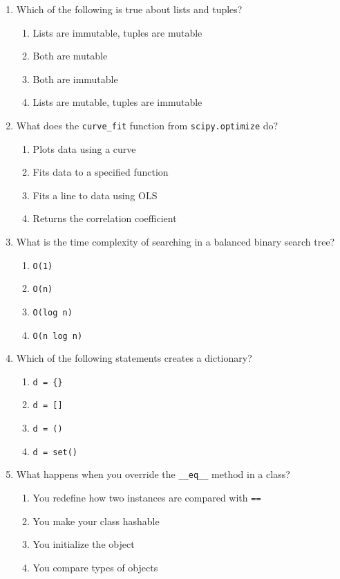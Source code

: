 \documentclass[12pt]{article}
\begin{document}
\begin{enumerate}[label=\arabic*.]
\item Which of the following is true about lists and tuples?  
\begin{enumerate}[label=\Alph*.]
\item Lists are immutable, tuples are mutable  
\item Both are mutable  
\item Both are immutable  
\item Lists are mutable, tuples are immutable
\end{enumerate}

\item What does the \texttt{curve\_fit} function from \texttt{scipy.optimize} do?  
\begin{enumerate}[label=\Alph*.]
\item Plots data using a curve  
\item Fits data to a specified function  
\item Fits a line to data using OLS  
\item Returns the correlation coefficient
\end{enumerate}

\item What is the time complexity of searching in a balanced binary search tree?  
\begin{enumerate}[label=\Alph*.]
\item \texttt{O(1)}  
\item \texttt{O(n)}  
\item \texttt{O(log n)}  
\item \texttt{O(n log n)}
\end{enumerate}

\item Which of the following statements creates a dictionary?  
\begin{enumerate}[label=\Alph*.]
\item \texttt{d = \{\}}  
\item \texttt{d = []}  
\item \texttt{d = ()}  
\item \texttt{d = set()}
\end{enumerate}

\item What happens when you override the \texttt{\_\_eq\_\_} method in a class?  
\begin{enumerate}[label=\Alph*.]
\item You redefine how two instances are compared with \texttt{==}  
\item You make your class hashable  
\item You initialize the object  
\item You compare types of objects
\end{enumerate}


\end{enumerate}
\end{document}
